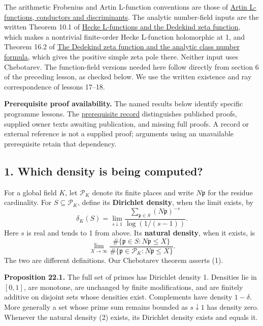 \documentclass[11pt,a4paper]{article}
\begin{document}
The arithmetic Frobenius and Artin L-function conventions are those of
\href{../artin-l-functions-conductors-and-discriminants.html}{Artin
L-functions, conductors and discriminants}. The analytic number-field
inputs are the written Theorem 10.1 of
\href{https://kokunoyumeto.github.io/open-math-courses/courses/NT-CFT/proof-dependencies.html\#NT-ADL-10}{Hecke
L-functions and the Dedekind zeta function}, which makes a nontrivial
finite-order Hecke L-function holomorphic at 1, and Theorem 16.2 of
\href{https://kokunoyumeto.github.io/open-math-courses/courses/NT-CFT/proof-dependencies.html\#NT-ANT-16}{The
Dedekind zeta function and the analytic class number formula}, which
gives the positive simple zeta pole there. Neither input uses
Chebotarev. The function-field versions needed here follow directly from
section 6 of the preceding lesson, as checked below. We use the written
existence and ray correspondence of lessons 17--18.

\textbf{Prerequisite proof availability.} The named results below
identify specific programme lessons. The
\href{https://kokunoyumeto.github.io/open-math-courses/courses/NT-CFT/proof-dependencies.html\#lesson-22}{prerequisite
record} distinguishes published proofs, supplied owner texts awaiting
publication, and missing full proofs. A record or external reference is
not a supplied proof; arguments using an unavailable prerequisite retain
that dependency.

\subsection{1. Which density is being
computed?}\label{which-density-is-being-computed}

For a global field \(K\), let \(\mathcal P_K\) denote its finite places
and write \(N\mathfrak p\) for the residue cardinality. For
\(S\subseteq\mathcal P_K\), define its \textbf{Dirichlet density}, when
the limit exists, by \[
\delta_K(S)=\lim_{s\downarrow1}
\frac{\sum_{\mathfrak p\in S}(N\mathfrak p)^{-s}}
     {\log(1/(s-1))}.
\tag{1}
\] Here \(s\) is real and tends to 1 from above. Its \textbf{natural
density}, when it exists, is \[
\lim_{X\to\infty}
\frac{\#\{\mathfrak p\in S:N\mathfrak p\leq X\}}
     {\#\{\mathfrak p\in\mathcal P_K:N\mathfrak p\leq X\}}.
\tag{2}
\] The two are different definitions. Our Chebotarev theorem asserts
(1).

\textbf{Proposition 22.1.} The full set of primes has Dirichlet density
1. Densities lie in \([0,1]\), are monotone, are unchanged by finite
modifications, and are finitely additive on disjoint sets whose
densities exist. Complements have density \(1-\delta\). More generally a
set whose prime sum remains bounded as \(s\downarrow1\) has density
zero. Whenever the natural density (2) exists, its Dirichlet density
exists and equals it.
\end{document}

